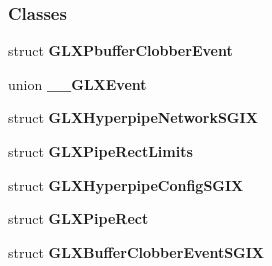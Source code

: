 \subsubsection*{Classes}
\begin{DoxyCompactItemize}
\item 
struct {\bf G\+L\+X\+Pbuffer\+Clobber\+Event}
\item 
union {\bf \+\_\+\+\_\+\+G\+L\+X\+Event}
\item 
struct {\bf G\+L\+X\+Hyperpipe\+Network\+S\+G\+IX}
\item 
struct {\bf G\+L\+X\+Pipe\+Rect\+Limits}
\item 
struct {\bf G\+L\+X\+Hyperpipe\+Config\+S\+G\+IX}
\item 
struct {\bf G\+L\+X\+Pipe\+Rect}
\item 
struct {\bf G\+L\+X\+Buffer\+Clobber\+Event\+S\+G\+IX}
\end{DoxyCompactItemize}
